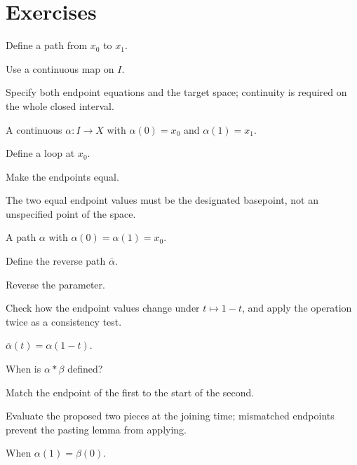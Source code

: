 \section{Exercises}

\begin{exercise}\label{exr:viii09-01}
Define a path from \(x_0\) to \(x_1\).
\end{exercise}
\begin{hint}
Use a continuous map on \(I\).

Specify both endpoint equations and the target space; continuity is required on the whole closed interval.
\end{hint}
\begin{solution}
A continuous \(\alpha:I\to X\) with \(\alpha(0)=x_0\) and \(\alpha(1)=x_1\).
\end{solution}

\begin{exercise}\label{exr:viii09-02}
Define a loop at \(x_0\).
\end{exercise}
\begin{hint}
Make the endpoints equal.

The two equal endpoint values must be the designated basepoint, not an unspecified point of the space.
\end{hint}
\begin{solution}
A path \(\alpha\) with \(\alpha(0)=\alpha(1)=x_0\).
\end{solution}

\begin{exercise}\label{exr:viii09-03}
Define the reverse path \(\overline\alpha\).
\end{exercise}
\begin{hint}
Reverse the parameter.

Check how the endpoint values change under \(t\mapsto1-t\), and apply the operation twice as a consistency test.
\end{hint}
\begin{solution}
\(\overline\alpha(t)=\alpha(1-t)\).
\end{solution}

\begin{exercise}\label{exr:viii09-04}
When is \(\alpha*\beta\) defined?
\end{exercise}
\begin{hint}
Match the endpoint of the first to the start of the second.

Evaluate the proposed two pieces at the joining time; mismatched endpoints prevent the pasting lemma from applying.
\end{hint}
\begin{solution}
When \(\alpha(1)=\beta(0)\).
\end{solution}

